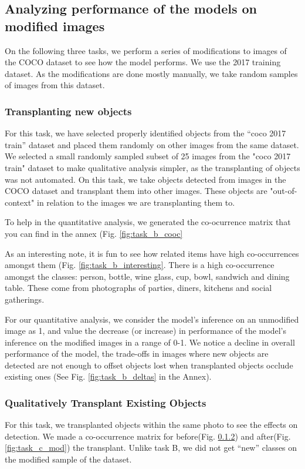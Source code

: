 \documentclass[11pt,a4paper,twocolumn,twoside]{article}
\begin{document}
\subsection{Analyzing performance of the models on modified images}
On the following three tasks, we perform a series of modifications to images of the COCO dataset to see how the model performs. We use the 2017 training dataset. As the modifications are done mostly manually, we take random samples of images from this dataset.

\subsubsection{Transplanting new objects}
For this task, we have selected properly identified objects from the “coco 2017 train” dataset and placed them randomly on other images from the same dataset. We selected a small randomly sampled subset of 25 images from the "coco 2017 train" dataset to make qualitative analysis simpler, as the transplanting of objects was not automated. On this task, we take objects detected from images in the COCO dataset and transplant them into other images. These objects are "out-of-context" in relation to the images we are transplanting them to. 

To help in the quantitative analysis, we generated the co-ocurrence matrix that you can find in the annex (Fig. \ref{fig:task_b_cooc}

As an interesting note, it is fun to see how related items have high co-occurrences amongst them (Fig. \ref{fig:task_b_interesting}. There is a high co-occurrence amongst the classes: person, bottle, wine glass, cup, bowl, sandwich and dining table. These come from photographs of parties, diners, kitchens and social gatherings.


For our quantitative analysis, we consider the model’s inference on an unmodified image as 1, and value the decrease (or increase) in performance of the model’s inference on the modified images in a range of 0-1. We notice a decline in overall performance of the model, the trade-offs in images where new objects are detected are not enough to offset objects lost when transplanted objects occlude existing ones (See Fig. \ref{fig:task_b_deltas} in the Annex). 

\subsubsection{Qualitatively Transplant Existing Objects}
For this task, we transplanted objects within the same photo to see the effects on detection. We made a co-occurrence matrix for before(Fig. \ref{}) and after(Fig. \ref{fig:task_c_mod}) the transplant. Unlike task B, we did not get “new” classes on the modified sample of the dataset.
\end{document}

